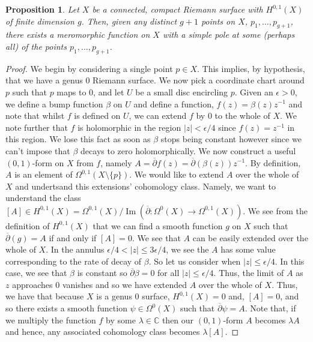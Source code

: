 \documentclass[11pt]{report}
\newtheorem{prop}[thm]{Proposition}
\theoremstyle{definition}
\DeclareMathOperator{\im}{Im}
\begin{document}
\begin{prop}\label{meroFunctionOnGenusGSurface}\label{merofunctions}
  Let $X$ be a connected, compact Riemann surface with $H^{0,1}(X)$ of finite dimension $g$. Then, given any distinct $g+1$ points on $X$, $p_1,\ldots, p_{g+1}$, there exists a meromorphic function on $X$ with a simple pole at some (perhaps all) of the points $p_1,\ldots, p_{g+1}$.
\end{prop} 
\begin{proof}
  We begin by considering a single point $p \in X$. This implies, by hypothesis, that we have a genus $0$ Riemann surface. We now pick a coordinate chart around $p$ such that $p$ maps to $0$, and let $U$ be a small disc encircling $p$. Given an $\epsilon > 0$, we define a bump function $\beta$ on $U$ and define a function, $f(z) = \beta(z)z^{-1}$ and note that whilst $f$ is defined on $U$, we can extend $f$ by $0$ to the whole of $X$. We note further that $f$ is holomorphic in the region $|z| < \epsilon/4$ since $f(z) = z^{-1}$ in this region. We lose this fact as soon as $\beta$ stops being constant however since we can't impose that $\beta$ decays to zero holomorphically. We now construct a useful $(0,1)$-form on $X$ from $f$, namely $A=\overline{\partial}f(z) = \overline{\partial}(\beta(z))z^{-1}$.
  By definition, $A$ is an element of $\Omega^{0,1}(X\setminus \{p\})$. We would like to extend $A$ over the whole of $X$ and undertsand this extensions' cohomology class. Namely, we want to understand the class $[A] \in H^{0,1}(X)=\Omega^{0,1}(X)/\im(\overline{\partial}:\Omega^0(X) \rightarrow \Omega^{0,1}(X))$. \newline
  We see from the definition of $H^{0,1}(X)$ that we can find a smooth function $g$ on $X$ such that $\overline{\partial}(g) = A$ if and only if $[A] = 0$.  We see that $A$ can be easily extended over the whole of $X$. In the annulus $\epsilon /4 < |z| \leq 3\epsilon /4$, we see the $A$ has some value corresponding to the rate of decay of $\beta$. So let us consider when $|z| \leq \epsilon /4$. In this case, we see that $\beta$ is constant so $\overline{\partial}\beta = 0$ for all $|z| \leq \epsilon /4$. Thus, the limit of $A$ as $z$ approaches $0$ vanishes and so we have extended $A$ over the whole of $X$. Thus, we have that because $X$ is a genus $0$ surface, $H^{0,1}(X)=0$ and, $[A] = 0$, and so there exists a smooth function $\psi \in \Omega^0(X)$ such that $\overline{\partial}\psi = A$. Note that, if we multiply the function $f$ by some $\lambda \in \mathbb{C}$ then our $(0,1)$-form $A$ becomes $\lambda A$ and hence, any associated cohomology class becomes $\lambda[A]$.


\end{proof}
\end{document}
